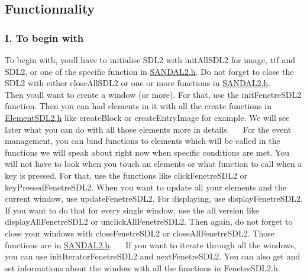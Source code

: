 \subsection*{Functionnality}

\subsubsection*{I. To begin with}

To begin with, you\textquotesingle{}ll have to initialise S\+D\+L2 with init\+All\+S\+D\+L2 for image, ttf and S\+D\+L2, or one of the specific function in \hyperlink{SANDAL2_8h}{S\+A\+N\+D\+A\+L2.\+h}. Do not forget to close the S\+D\+L2 with either close\+All\+S\+D\+L2 or one or more functions in \hyperlink{SANDAL2_8h}{S\+A\+N\+D\+A\+L2.\+h}.~\newline
~\newline
 Then you\textquotesingle{}ll want to create a window (or more). For that, use the init\+Fenetre\+S\+D\+L2 function. Then you can had elements in it with all the create functions in \hyperlink{ElementSDL2_8h}{Element\+S\+D\+L2.\+h} like create\+Block or create\+Entry\+Image for example. We will see later what you can do with all those elements more in details.~\newline
~\newline
 For the event management, you can bind functions to elements which will be called in the functions we will speak about right now when specific conditions are met. You will not have to look when you touch an elements or what function to call when a key is pressed. For that, use the functions like click\+Fenetre\+S\+D\+L2 or key\+Pressed\+Fenetre\+S\+D\+L2. When you want to update all your elements and the current window, use update\+Fenetre\+S\+D\+L2. For displaying, use display\+Fenetre\+S\+D\+L2. If you want to do that for every single window, use the \textquotesingle{}all\textquotesingle{} version like display\+All\+Fenetre\+S\+D\+L2 or unclick\+All\+Fenetre\+S\+D\+L2. Then again, do not forget to close your windows with close\+Fenetre\+S\+D\+L2 or close\+All\+Fenetre\+S\+D\+L2. Those functions are in \hyperlink{SANDAL2_8h}{S\+A\+N\+D\+A\+L2.\+h}.~\newline
~\newline
 If you want to iterate through all the windows, you can use init\+Iterator\+Fenetre\+S\+D\+L2 and next\+Fenetre\+S\+D\+L2. You can also get and set informations about the window with all the functions in Fenetre\+S\+D\+L2.\+h.~\newline


